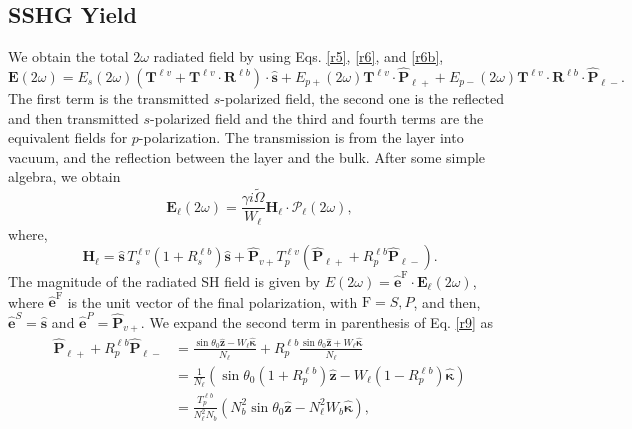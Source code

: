 

\subsection{SSHG Yield}\label{sec:yield}

We obtain the total $2\omega$ radiated field by using Eqs. \eqref{r5},
\eqref{r6}, and \eqref{r6b},
\begin{equation*}\label{r7}
\mathbf{E}(2\omega)
= E_s(2\omega)
\left(
\mathbf{T}^{\ell v} + \mathbf{T}^{\ell v}\cdot\mathbf{R}^{\ell b}
\right)
\cdot\hat{\mathbf{s}}
+ E_{p+}(2\omega)\mathbf{T}^{\ell v}\cdot\hat{\mathbf{P}}_{\ell +}
 + E_{p-}(2\omega)\mathbf{T}^{\ell v}
\cdot\mathbf{R}^{\ell b}\cdot\hat{\mathbf{P}}_{\ell-}.
\end{equation*}
The first term is  the transmitted $s$-polarized field, the second one is the
reflected and then transmitted $s$-polarized field and the third and fourth
terms are the equivalent fields for $p$-polarization. The transmission is from
the layer into vacuum, and the reflection between the layer and the bulk. After
some simple algebra, we obtain
\begin{equation}\label{r8}
\mathbf{E}_{\ell}(2\omega) = \frac{\gamma i\tilde{\Omega}}{W_{\ell}}
\mathbf{H}_{\ell}\cdot\boldsymbol{\mathcal{P}}_\ell(2\omega),
\end{equation}
where,
\begin{equation}\label{r9}
\mathbf{H}_{\ell}
= \hat{\mathbf{s}}\,T_s^{\ell v}\left(1+R_s^{\ell b}\right)\hat{\mathbf{s}}
+ \hat{\mathbf{P}}_{v+}T_{p}^{\ell v}
\left(
\hat{\mathbf{P}}_{\ell +} +R_{p}^{\ell b}\hat{\mathbf{P}}_{\ell -}
\right). 
\end{equation}
The magnitude of the radiated SH field is given by
$E(2\omega)=\hat{\mathbf{e}}^{\mathrm{F}}\cdot\mathbf{E}_\ell(2\omega)$, where
$\hat{\mathbf{e}}^{\mathrm{F}}$ is the unit vector of the final polarization,
with $\mathrm{F}=S,P$, and then, $\hat{\mathbf{e}}^S=\hat{\mathbf{s}}$ and
$\hat{\mathbf{e}}^P=\hat{\mathbf{P}}_{v+}$. We expand the second term in
parenthesis of Eq. \eqref{r9} as
\begin{equation*}\label{m1}
\begin{split}
\hat{\mathbf{P}}_{\ell +} + R_{p}^{\ell b}\hat{\mathbf{P}}_{\ell -}
&= \frac{\sin\theta_{0}\hat{\mathbf{z}} - W_{\ell}\hat{\boldsymbol{\kappa}}}
        {N_{\ell}}
 + R_{p}^{\ell b}
   \frac{\sin\theta_{0}\hat{\mathbf{z}} + W_{\ell}\hat{\boldsymbol{\kappa}}}
        {N_{\ell}}
\\\nonumber
&= \frac{1}{N_{\ell}}
\left(
\sin\theta_{0}(1+R^{\ell b}_{p})\hat{\mathbf{z}}
- W_{\ell}(1-R^{\ell b}_{p})\hat{\boldsymbol{\kappa}} 
\right)
\\\nonumber 
&= \frac{T^{\ell b}_{p}}{N^{2}_{\ell}N_{b}}
\left(
  N^{2}_{b}\sin\theta_{0}\hat{\mathbf{z}} 
- N^{2}_{\ell}W_{b}\hat{\boldsymbol{\kappa}}
\right)
,
\end{split}
\end{equation*}
